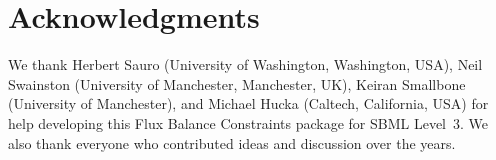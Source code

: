 
\section{Acknowledgments}

We thank Herbert Sauro (University of Washington, Washington, USA), Neil
Swainston (University of Manchester, Manchester, UK), Keiran Smallbone
(University of Manchester), and Michael Hucka (Caltech, California, USA)
for help developing this Flux Balance Constraints package for SBML
Level~3.  We also thank everyone who contributed ideas and discussion over
the years.
